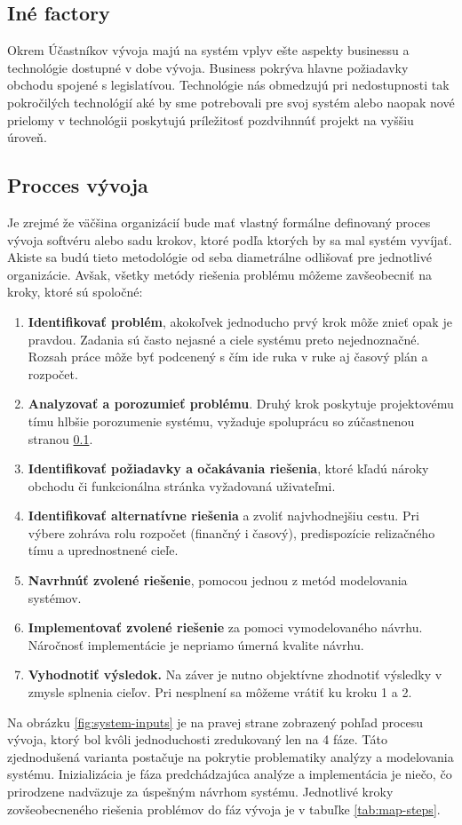\subsection{Iné factory}
Okrem Účastníkov vývoja majú na systém vplyv ešte aspekty businessu a technológie dostupné v dobe vývoja. Business pokrýva hlavne požiadavky obchodu spojené s legislatívou. Technológie nás obmedzujú pri nedostupnosti tak pokročilých technológií aké by sme potrebovali pre svoj systém alebo naopak nové prielomy v technológii poskytujú príležitosť pozdvihnnúť projekt na vyššiu úroveň.

\subsection{Procces vývoja}
\label{proces_vyvoja}

Je zrejmé že väčšina organizácií bude mať vlastný formálne definovaný proces vývoja softvéru alebo sadu krokov, ktoré podľa ktorých by sa mal systém vyvíjať. Akiste sa budú tieto metodológie od seba diametrálne odlišovať pre jednotlivé organizácie. Avšak, všetky metódy riešenia problému môžeme zavšeobecniť na kroky, ktoré sú spoločné: \\

\begin{enumerate}
	\item \textbf{Identifikovať problém}, akokoľvek jednoducho prvý krok môže znieť opak je pravdou. Zadania sú často nejasné a ciele systému preto nejednoznačné. Rozsah práce môže byť podcenený s čím ide ruka v ruke aj časový plán a rozpočet.
	\item \textbf{Analyzovať a porozumieť problému}. Druhý krok poskytuje projektovému tímu hlbšie porozumenie systému, vyžaduje spoluprácu so zúčastnenou stranou \ref{}.
	\item \textbf{Identifikovať požiadavky a očakávania riešenia}, ktoré kľadú nároky obchodu či funkcionálna stránka vyžadovaná uživateľmi.
	\item \textbf{Identifikovať alternatívne riešenia} a zvoliť najvhodnejšiu cestu. Pri výbere zohráva rolu rozpočet (finančný i časový), predispozície relizačného tímu a uprednostnené cieľe.
	\item \textbf{Navrhnúť zvolené riešenie}, pomocou jednou z metód modelovania systémov.
	\item \textbf{Implementovať zvolené riešenie} za pomoci vymodelovaného návrhu. Náročnosť implementácie je nepriamo úmerná kvalite návrhu.
	\item \textbf{Vyhodnotiť výsledok.} Na záver je nutno objektívne zhodnotiť výsledky v zmysle splnenia cieľov. Pri nesplnení sa môžeme vrátiť ku kroku 1 a 2.
\end{enumerate}
\vspace{1cm}
Na obrázku \ref{fig:system-inputs} je na pravej strane zobrazený pohľad procesu vývoja, ktorý bol kvôli jednoduchosti zredukovaný len na 4 fáze. Táto zjednodušená varianta postačuje na pokrytie problematiky analýzy a modelovania systému. Inizializácia je fáza predchádzajúca analýze a implementácia je niečo, čo prirodzene nadväzuje za úspešným návrhom systému. Jednotlivé kroky zovšeobecneného riešenia problémov do fáz vývoja je v tabuľke \ref{tab:map-steps}. \\

